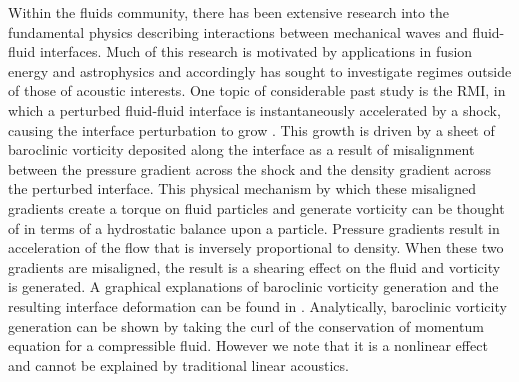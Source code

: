 Within the fluids community, there has been extensive research into
the fundamental physics describing interactions between mechanical
waves and fluid-fluid interfaces. Much of this research is motivated
by applications in fusion energy and astrophysics and accordingly has
sought to investigate regimes outside of those of acoustic
interests. One topic of considerable past study is the \ac{RMI}, in
which a perturbed fluid-fluid interface is instantaneously accelerated
by a shock, causing the interface perturbation to grow
\citep{Brouillette2002,Drake2006}. This growth is driven by a sheet of
baroclinic vorticity deposited along the interface as a result of
misalignment between the pressure gradient across the shock and the
density gradient across the perturbed interface. This physical
mechanism by which these misaligned gradients create a torque on fluid
particles and generate vorticity can be thought of in terms of a
hydrostatic balance upon a particle. Pressure gradients result in
acceleration of the flow that is inversely proportional to
density. When these two gradients are misaligned, the result is a
shearing effect on the fluid and vorticity is generated. A graphical
explanations of baroclinic vorticity generation and the resulting
interface deformation can be found in
\citep{Heifetz2015}. Analytically, baroclinic vorticity generation can
be shown by taking the curl of the conservation of momentum equation
for a compressible fluid. However we note that it is a nonlinear
effect and cannot be explained by traditional linear acoustics.

